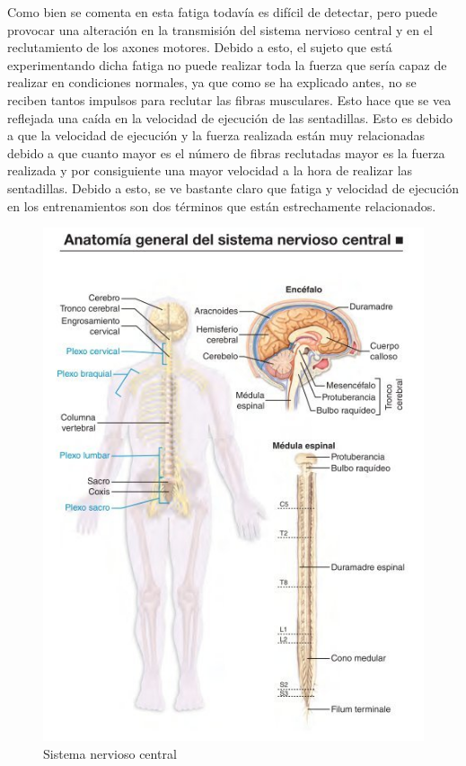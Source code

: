 Como bien se comenta en \cite{moreno2017fatiga} esta fatiga todavía es difícil de detectar, pero puede provocar una alteración en la transmisión del sistema nervioso central y en el reclutamiento de los axones motores. Debido a esto, el sujeto que está experimentando dicha fatiga no puede realizar toda la fuerza que sería capaz de realizar en condiciones normales, ya que como se ha explicado antes, no se reciben tantos impulsos para reclutar las fibras musculares. Esto hace que se vea reflejada una caída en la velocidad de ejecución de las sentadillas. Esto es debido a que la velocidad de ejecución y la fuerza realizada están muy relacionadas debido a que cuanto mayor es el número de fibras reclutadas mayor es la fuerza realizada y por consiguiente una mayor velocidad a la hora de realizar las sentadillas. Debido a esto, se ve bastante claro que fatiga y velocidad de ejecución en los entrenamientos son dos términos que están estrechamente relacionados.


\begin{figure}[ht]
\centering
\includegraphics[scale=0.8]{imagenes/SNCcompleto.jpg}
\caption{Sistema nervioso central \cite{imagenSNC}}
\label{fig:snc}
\end{figure}



